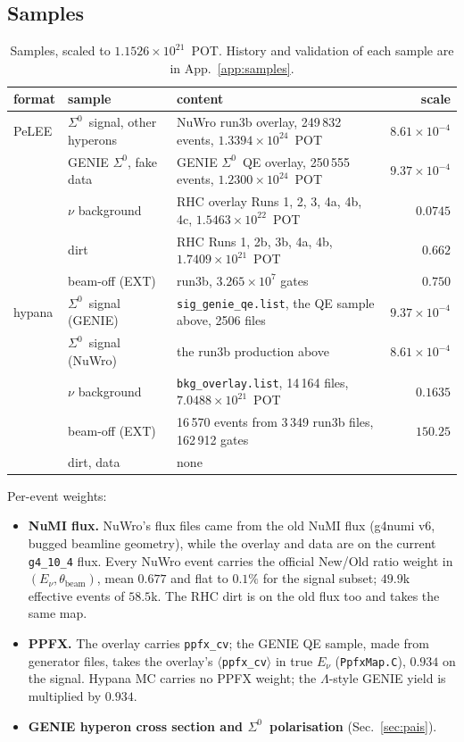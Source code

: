 \documentclass[11pt,a4paper]{article}
\newcommand{\Szero}{\ensuremath{\Sigma^{0}}}
\newcommand{\Lam}{\ensuremath{\Lambda}}
\begin{document}
\subsection{Samples}
\label{sec:samples}

\begin{table}[h]\centering
\caption{Samples, scaled to $1.1526\times10^{21}$~POT. History and validation of each
sample are in App.~\ref{app:samples}.}
\label{tab:samples}
\small
\begin{tabular}{llp{}r}
\toprule
format & sample & content & scale \\
\midrule
PeLEE & \Szero\ signal, other hyperons & NuWro run3b overlay, 249\,832 events, $1.3394\times10^{24}$~POT & $8.61\times10^{-4}$ \\
      & GENIE \Szero, fake data & GENIE \Szero\ QE overlay, 250\,555 events, $1.2300\times10^{24}$~POT & $9.37\times10^{-4}$ \\
      & $\nu$ background & RHC overlay Runs 1, 2, 3, 4a, 4b, 4c, $1.5463\times10^{22}$~POT & $0.0745$ \\
      & dirt & RHC Runs 1, 2b, 3b, 4a, 4b, $1.7409\times10^{21}$~POT & $0.662$ \\
      & beam-off (EXT) & run3b, $3.265\times10^{7}$ gates & $0.750$ \\
\midrule
hypana & \Szero\ signal (GENIE) & \texttt{sig\_genie\_qe.list}, the QE sample above, 2506 files & $9.37\times10^{-4}$ \\
       & \Szero\ signal (NuWro) & the run3b production above & $8.61\times10^{-4}$ \\
       & $\nu$ background & \texttt{bkg\_overlay.list}, 14\,164 files, $7.0488\times10^{21}$~POT & $0.1635$ \\
       & beam-off (EXT) & 16\,570 events from 3\,349 run3b files, 162\,912 gates & $150.25$ \\
       & dirt, data & none & \\
\bottomrule
\end{tabular}
\end{table}

\noindent Per-event weights:
\begin{itemize}
  \item \textbf{NuMI flux.} NuWro's flux files came from the old NuMI flux (g4numi v6,
        bugged beamline geometry), while the overlay and data are on the current
        \texttt{g4\_10\_4} flux. Every NuWro event carries the official New/Old ratio
        weight in $(E_\nu,\theta_{\mathrm{beam}})$, mean $0.677$ and flat to $0.1\%$ for
        the signal subset; $49.9$k effective events of $58.5$k. The RHC dirt is on the
        old flux too and takes the same map.
  \item \textbf{PPFX.} The overlay carries \texttt{ppfx\_cv}; the GENIE QE sample, made
        from generator files, takes the overlay's $\langle$\texttt{ppfx\_cv}$\rangle$ in
        true $E_\nu$ (\texttt{PpfxMap.C}), $0.934$ on the signal. Hypana MC carries no PPFX
        weight; the \Lam-style GENIE yield is multiplied by $0.934$.
  \item \textbf{GENIE hyperon cross section and \Szero\ polarisation}
        (Sec.~\ref{sec:pais}).
\end{itemize}
\end{document}
